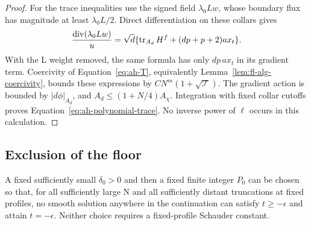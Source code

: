 \begin{proof}
For the trace inequalities use the signed field
\(\lambda_0Lw\), whose boundary flux has magnitude at least
\(\lambda_0L/2\).  Direct differentiation on these collars gives
\[
 \frac{\operatorname{div}(\lambda_0Lw)}u
 =\sqrt d\{\operatorname{tr}_{A_d}H^f+(dp+p+2)a x_t\}.
\]
With the L weight removed, the same formula has only \(dp\,a x_t\)
in its gradient term.  Coercivity of
Equation~\eqref{eq:ah-T}, equivalently
Lemma~\ref{lem:fl-alg-coercivity}, bounds these expressions by
\(CN^m(1+\sqrt{\mathcal T})\).
The gradient action is bounded by \(|d\phi|_{A_d}\), and
\(A_d\le(1+N/4)A_\chi\).
Integration with fixed collar cutoffs proves
Equation~\eqref{eq:ah-polynomial-trace}.
No inverse power of \(\ell\) occurs in this calculation.
\end{proof}

\subsection{Exclusion of the floor}
\label{subsec:ah-floor}

\begin{lemma}\label{lem:ah-floor}
A fixed sufficiently small \(\delta_0>0\) and then a fixed finite
integer \(P_0\) can be chosen so that, for all sufficiently large
N and all sufficiently distant truncations at fixed profiles,
no smooth solution anywhere in the continuation can satisfy
\(t\ge-\epsilon\) and attain \(t=-\epsilon\).
Neither choice requires a fixed-profile Schauder constant.
\end{lemma}

